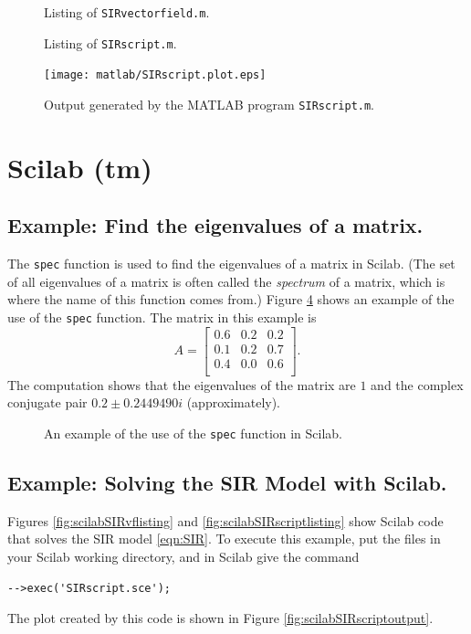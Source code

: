 \documentclass[reqno]{immbook}
\numberwithin{equation}{chapter}
\numberwithin{question}{section}
\numberwithin{theorem}{chapter}
\numberwithin{figure}{chapter}
\theoremstyle{definition}
\begin{document}
%
%
\begin{figure}
\fbox{%

}
\caption{Listing of \texttt{SIRvectorfield.m}.}
\label{fig:matlabSIRvflisting}
\end{figure}

\begin{figure}
\fbox{%

}
\caption{Listing of \texttt{SIRscript.m}.}
\label{fig:matlabSIRscriptlisting}
\end{figure}

\begin{figure}
\centerline{\texttt{[image: matlab/SIRscript.plot.eps]}}
\caption{Output generated by the MATLAB program
\texttt{SIRscript.m}.}
\label{fig:matlabSIRscriptoutput}
\end{figure}
%
%
\newpage
\section{Scilab (tm)}

\subsection*{Example: Find the eigenvalues of a matrix.}
The \texttt{spec} function is used to find the eigenvalues
of a matrix in Scilab. (The set of all eigenvalues of a matrix
is often called the \emph{spectrum} of a matrix,
which is where the name of this function comes from.)
Figure \ref{fig:scilabeigenvaluesoutput} shows an example
of the use of the \texttt{spec} function.
The matrix in this example is
\[
   A = \begin{bmatrix}
          0.6 & 0.2 & 0.2 \\
	  0.1 & 0.2 & 0.7 \\
	  0.4 & 0.0 & 0.6 \\
       \end{bmatrix} .
\]
The computation shows that the eigenvalues of the 
matrix are $1$ and the complex conjugate pair
$0.2 \pm  0.2449490i$
(approximately).

\begin{figure}[hbp]
\fbox{%

}
\caption{An example of the use of
the \texttt{spec} function in Scilab.}
\label{fig:scilabeigenvaluesoutput}
\end{figure}


\subsection*{Example: Solving the SIR Model with Scilab.}
Figures \ref{fig:scilabSIRvflisting} and
\ref{fig:scilabSIRscriptlisting} show Scilab code that solves
the SIR model \eqref{eqn:SIR}.
To execute this example, put the files in your Scilab working
directory, and in Scilab give the command
\begin{verbatim}
-->exec('SIRscript.sce');
\end{verbatim}
The plot created by this code is shown
in Figure \ref{fig:scilabSIRscriptoutput}.
\end{document}
